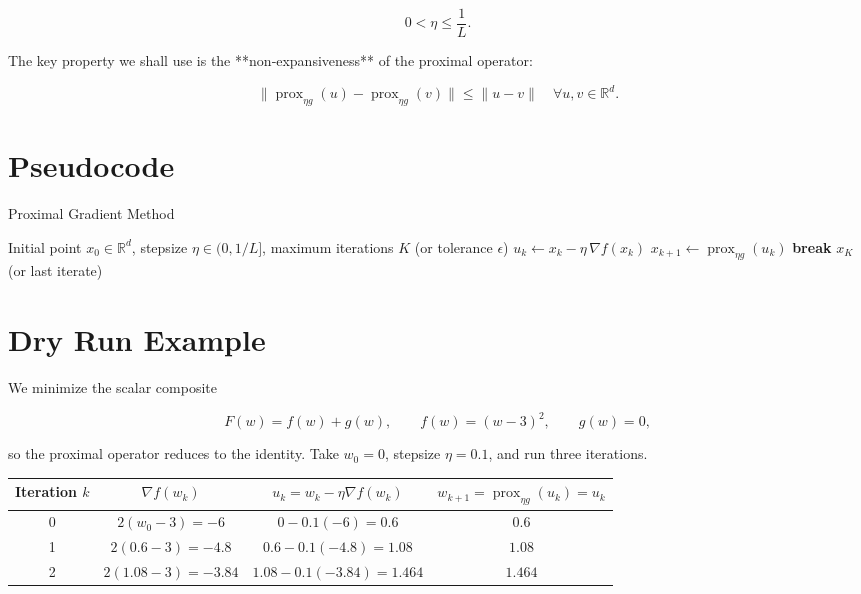 \documentclass{article}
\newcommand{\prox}{\operatorname{prox}}
\newcommand{\grad}{\nabla}
\newcommand{\R}{\mathbb{R}}
\begin{document}
\[
0<\eta \le \frac{1}{L}.
\tag{2}
\]

The key property we shall use is the **non‑expansiveness** of the proximal operator:

\[
\|\prox_{\eta g}(u)-\prox_{\eta g}(v)\|\le \|u-v\|\quad\forall u,v\in\R^{d}.
\tag{3}
\]

\section*{Pseudocode}
\begin{algorithm}[H]
\caption{Proximal Gradient Method}
\begin{algorithmic}[1]
\Require Initial point $x_0\in\R^{d}$, stepsize $\eta\in(0,1/L]$, maximum iterations $K$ (or tolerance $\epsilon$)
    \State $u_k \gets x_k - \eta\,\grad f(x_k)$ \hfill {}
    \State $x_{k+1} \gets \prox_{\eta g}(u_k)$ \hfill {}
        \State \textbf{break}
    \EndIf
\EndFor
\State \Return $x_{K}$ (or last iterate)
\end{algorithmic}
\end{algorithm}

\section*{Dry Run Example}
We minimize the scalar composite  

\[
F(w)=f(w)+g(w),\qquad 
f(w)=(w-3)^{2},\qquad g(w)=0,
\]

so the proximal operator reduces to the identity.  
Take $w_0=0$, stepsize $\eta=0.1$, and run three iterations.

\begin{center}
\begin{tabular}{c|c|c|c}
Iteration $k$ & $ \grad f(w_k)$ & $u_k = w_k-\eta\grad f(w_k)$ & $w_{k+1}= \prox_{\eta g}(u_k)=u_k$ \\ \hline
0 & $2(w_0-3)=-6$ & $0-0.1(-6)=0.6$ & $0.6$ \\
1 & $2(0.6-3)=-4.8$ & $0.6-0.1(-4.8)=1.08$ & $1.08$ \\
2 & $2(1.08-3)=-3.84$ & $1.08-0.1(-3.84)=1.464$ & $1.464$
\end{tabular}
\end{center}
\end{document}
